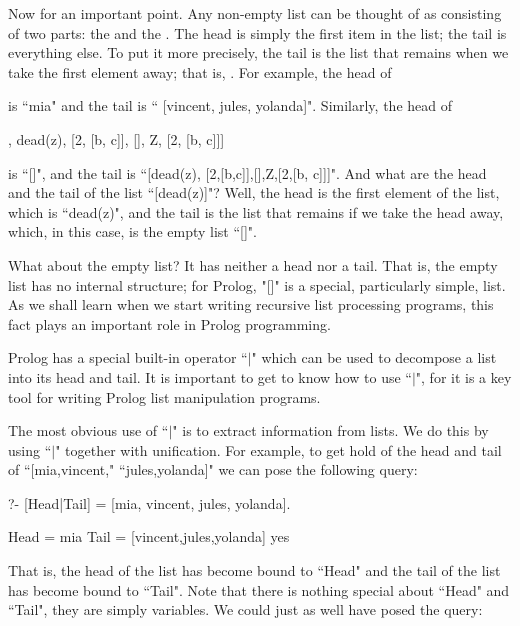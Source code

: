 Now for an important point.  Any non-empty list can be thought of as
consisting of two parts: the  and the .  The
head is simply the first item in the list; the tail is everything
else. To put it more precisely, the tail is the list
that remains when we take the first element away; that is,
. For example, the head
of

\begin{LPNcodedisplay}
\end{LPNcodedisplay}
is ``mia" and the tail is `` [vincent, jules, yolanda]".
Similarly, the head of
  \begin{LPNcodedisplay}
[[], dead(z), [2, [b, c]], [], Z, [2, [b, c]]]
\end{LPNcodedisplay}
is ``[]", and the
tail is ``[dead(z), [2,[b,c]],[],Z,[2,[b, c]]]".
And what are the head and the tail of the list ``[dead(z)]"?
Well, the head is the first element of the list, which is
``dead(z)", and the tail is the list that remains if we take
the head away, which, in this case, is the empty list ``[]".

What about the empty list? It has neither a head nor a tail.
That is, the empty list has no internal structure; for Prolog,
"[]" is a special, particularly simple, list.  As we shall
learn when we start writing recursive list processing programs, this
fact plays an important role in Prolog programming.

Prolog has a special built-in operator ``$|$" which can be used to
decompose a list into its head and tail. It is important to get to
know how to use ``$|$", for it is a key tool for writing Prolog list
manipulation programs.

The most obvious use of ``$|$" is to extract information from lists.  We
do this by using ``$|$" together with unification.  For example, to get
hold of the head and tail of ``[mia,vincent," ``jules,yolanda]" we can
pose the following query:

\begin{LPNcodedisplay}
?- [Head|Tail] = [mia, vincent, jules, yolanda].

Head = mia
Tail = [vincent,jules,yolanda]
yes
\end{LPNcodedisplay}
That is, the head of the list has become bound to ``Head" and the
tail of the list has become bound to ``Tail".  Note that there is
nothing special about ``Head" and ``Tail", they are simply
variables.  We could just as well have posed the query:



